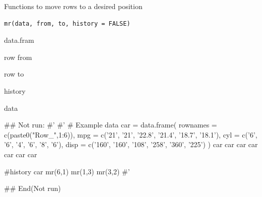 \documentclass[a4paper]{book}
\begin{document}
%
\begin{Description}
Functions to move rows to a desired position
\end{Description}
%
\begin{Usage}
\begin{verbatim}
mr(data, from, to, history = FALSE)
\end{verbatim}
\end{Usage}
%
\begin{Arguments}
\begin{ldescription}
\item[\code{data}] data.fram

\item[\code{from}] row from

\item[\code{to}] row to

\item[\code{history}] history
\end{ldescription}
\end{Arguments}
%
\begin{Value}
data
\end{Value}
%
\begin{Examples}
\begin{ExampleCode}

\#\# Not run: 
#'
#' # Example data
car = data.frame(
  rownames = c(paste0("Row_",1:6)),
  mpg = c('21', '21', '22.8', '21.4', '18.7', '18.1'),
  cyl = c('6', '6', '4', '6', '8', '6'),
  disp = c('160', '160', '108', '258', '360', '225')
)
car
car %
car %
car %
car %
car %
car %

#history
car %
  mr(6,1)%
  mr(1,3)%
  mr(3,2)
#'

## End(Not run)


\end{ExampleCode}
\end{Examples}
\end{document}
